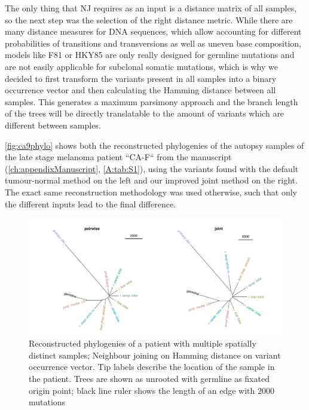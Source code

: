 The only thing that NJ requires as an input is a distance matrix of all samples, so the next step was the selection of the right distance metric. While there are many distance measures for DNA sequences, which allow accounting for different probabilities of transitions and transversions as well as uneven base composition, models like F81 \cite{Felsenstein1981} or HKY85 \cite{Hasegawa1985} are only really designed for germline mutations and are not easily applicable for subclonal somatic mutations, which is why we decided to first transform the variants present in all samples into a binary occurrence vector and then calculating the Hamming distance \cite{Hamming1950} between all samples. This generates a maximum parsimony approach and the branch length of the trees will be directly translatable to the amount of variants which are different between samples. 

\autoref{fig:ca9phylo} shows both the reconstructed phylogenies of the autopsy samples of the late stage melanoma patient ``CA-F`` from the manuscript (\autoref{ch:appendixManuscript}, \autoref{A:tab:S1}), using the variants found with the default tumour-normal method on the left and our improved joint method on the right. The exact same reconstruction methodology was used otherwise, such that only the different inputs lead to the final difference.

\begin{figure}[!ht]
\centering
\includegraphics[width=.99\linewidth]{Figures/phyloCA9.pdf}
\caption[Reconstructed phylogenies of joint samples]{Reconstructed phylogenies of a patient with multiple spatially distinct samples; Neighbour joining on Hamming distance on variant occurrence vector. Tip labels describe the location of the sample in the patient. Trees are shown as unrooted with germline as fixated origin point; black line ruler shows the length of an edge with 2000 mutations}\label{fig:ca9phylo}
\end{figure}

